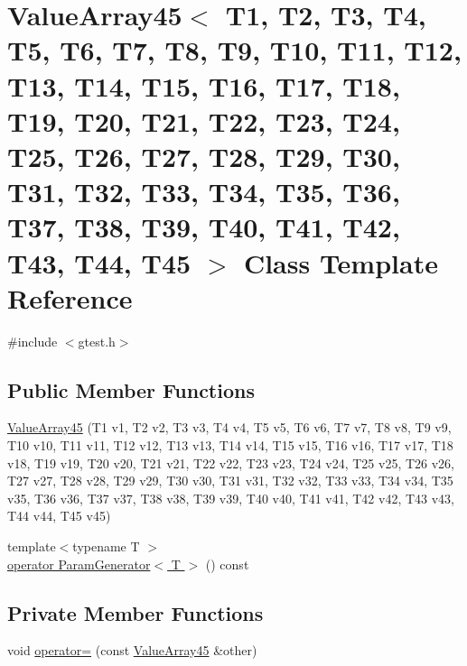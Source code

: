 \hypertarget{classtesting_1_1internal_1_1ValueArray45}{\section{\-Value\-Array45$<$ \-T1, \-T2, \-T3, \-T4, \-T5, \-T6, \-T7, \-T8, \-T9, \-T10, \-T11, \-T12, \-T13, \-T14, \-T15, \-T16, \-T17, \-T18, \-T19, \-T20, \-T21, \-T22, \-T23, \-T24, \-T25, \-T26, \-T27, \-T28, \-T29, \-T30, \-T31, \-T32, \-T33, \-T34, \-T35, \-T36, \-T37, \-T38, \-T39, \-T40, \-T41, \-T42, \-T43, \-T44, \-T45 $>$ \-Class \-Template \-Reference}
\label{d8/db6/classtesting_1_1internal_1_1ValueArray45}
}


{\ttfamily \#include $<$gtest.\-h$>$}

\subsection*{\-Public \-Member \-Functions}
\begin{DoxyCompactItemize}
\item 
\hyperlink{classtesting_1_1internal_1_1ValueArray45_a5bde9575bfb729a9dff38c84438b23a6}{\-Value\-Array45} (\-T1 v1, \-T2 v2, \-T3 v3, \-T4 v4, \-T5 v5, \-T6 v6, \-T7 v7, \-T8 v8, \-T9 v9, \-T10 v10, \-T11 v11, \-T12 v12, \-T13 v13, \-T14 v14, \-T15 v15, \-T16 v16, \-T17 v17, \-T18 v18, \-T19 v19, \-T20 v20, \-T21 v21, \-T22 v22, \-T23 v23, \-T24 v24, \-T25 v25, \-T26 v26, \-T27 v27, \-T28 v28, \-T29 v29, \-T30 v30, \-T31 v31, \-T32 v32, \-T33 v33, \-T34 v34, \-T35 v35, \-T36 v36, \-T37 v37, \-T38 v38, \-T39 v39, \-T40 v40, \-T41 v41, \-T42 v42, \-T43 v43, \-T44 v44, \-T45 v45)
\item 
{\footnotesize template$<$typename T $>$ }\\\hyperlink{classtesting_1_1internal_1_1ValueArray45_a08ef46fa12c9dd8ef6fc630baeea89b7}{operator Param\-Generator$<$ T $>$} () const 
\end{DoxyCompactItemize}
\subsection*{\-Private \-Member \-Functions}
\begin{DoxyCompactItemize}
\item 
void \hyperlink{classtesting_1_1internal_1_1ValueArray45_aceddf7b59afdcbce35d3bca546de7f46}{operator=} (const \hyperlink{classtesting_1_1internal_1_1ValueArray45}{\-Value\-Array45} \&other)
\end{DoxyCompactItemize}
